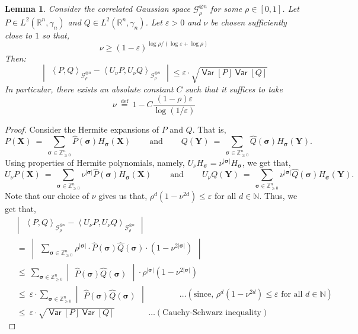 \documentclass[11pt]{article}
\newcommand{\inbrace}[1]{\left \{ #1 \right \}}
\newcommand{\inparen}[1]{\left ( #1 \right )}
\newcommand{\inangle}[1]{\left \langle #1 \right \rangle}
\newcommand{\inabs}[1]{\begin{vmatrix} #1 \end{vmatrix}}
\newcommand{\set}[1]{\inbrace{#1}}
\newcommand{\defeq}{\stackrel{\mathrm{def}}{=}}
\DeclareMathOperator*{\Var}{\mathsf{Var}}
\newcommand{\sAND}{\ \mathrm{and} \ }
\newcommand{\what}[1]{\widehat{#1}}
\newcommand{\eps}{\varepsilon}
\newcommand{\bbN}{{\mathbb N}}
\newcommand{\bbR}{{\mathbb R}}
\newcommand{\bbZ}{{\mathbb Z}}
\newcommand{\bX}{\mathbf{X}}
\newcommand{\bY}{\mathbf{Y}}
\newcommand{\bsigma}{{\boldsymbol \sigma}}
\newcommand{\calG}{\mathcal{G}}
\newtheorem{lem}[theorem]{Lemma}
\begin{document}
\begin{lem} \label{lem:gaussian_smoothing}
	Consider the correlated Gaussian space $\calG_\rho^{\otimes n}$ for some $\rho \in [0,1]$.
	Let $P \in L^2(\bbR^n, \gamma_{n})$ and $Q \in L^2(\bbR^n, \gamma_{n})$. Let $\eps > 0$ and $\nu$ be chosen sufficiently close to $1$ so that,
	\[\nu \ge (1-\eps)^{\log \rho/(\log \eps + \log \rho)}\]
	Then:
	\[\inabs{\inangle{P, Q}_{\calG_\rho^{\otimes n}} - \inangle{U_{\nu}P, U_{\nu}Q}_{\calG_\rho^{\otimes n}}} \le \eps \cdot \sqrt{\Var[P] \Var[Q]}\]
	In particular, there exists an absolute constant $C$ such that it suffices to take
	$$\nu ~\defeq~ 1 - C \frac{(1-\rho)\eps}{\log (1/\eps)}$$
\end{lem}
\begin{proof}%
	Consider the Hermite expansions of $P$ and $Q$. That is,
	\[ P(\bX) ~=~ \sum_{\bsigma \in \bbZ_{\ge 0}^n} \what{P}(\bsigma) H_{\bsigma}(\bX) \qquad \sAND \qquad Q(\bY) ~=~ \sum_{\bsigma \in \bbZ_{\ge 0}^n} \what{Q}(\bsigma) H_{\bsigma}(\bY).\]
	Using properties of Hermite polynomials, namely, $U_{\nu} H_{\bsigma} = \nu^{|\bsigma|} H_{\bsigma}$, we get that,
	\[ U_\nu P(\bX) ~=~ \sum_{\bsigma \in \bbZ_{\ge 0}^n} \nu^{|\bsigma|} \what{P}(\bsigma) H_{\bsigma}(\bX) \qquad \sAND \qquad U_\nu Q(\bY) ~=~ \sum_{\bsigma \in \bbZ_{\ge 0}^n} \nu^{|\bsigma|} \what{Q}(\bsigma) H_{\bsigma}(\bY).\]
	Note that our choice of $\nu$ gives us that, $\rho^{d} \inparen{1 - \nu^{2d}} \le \eps$ for all $d \in \bbN$. Thus, we get that,
	\begin{align*}
	&\inabs{\inangle{P, Q}_{\calG_\rho^{\otimes n}} - \inangle{U_{\nu}P, U_{\nu}Q}_{\calG_\rho^{\otimes n}}}\\
	&~=~ \inabs{\sum\limits_{\bsigma \in \bbZ_{\ge 0}^n} \rho^{|\bsigma|} \cdot \what{P}(\bsigma) \what{Q}(\bsigma) \cdot \inparen{1 - \nu^{2|\bsigma|}}}\\
	&~\le~ \sum\limits_{\bsigma \in \bbZ_{\ge 0}^n} \inabs{\what{P}(\bsigma) \what{Q}(\bsigma)} \cdot \rho^{|\bsigma|} \inparen{1 - \nu^{2|\bsigma|}}\\
	&~\le~ \eps \cdot \sum\limits_{\bsigma \in \bbZ_{\ge 0}^n} \inabs{\what{P}(\bsigma) \what{Q}(\bsigma)} \qquad \qquad \ldots (\text{since, } \rho^{d} \inparen{1 - \nu^{2d}} \le \eps \text{ for all } d \in \bbN)\\
	&~\le~ \eps \cdot \sqrt{\Var[P] \Var[Q]} \qquad \qquad \ldots (\text{Cauchy-Schwarz inequality})
	\end{align*}
\end{proof}
\end{document}
